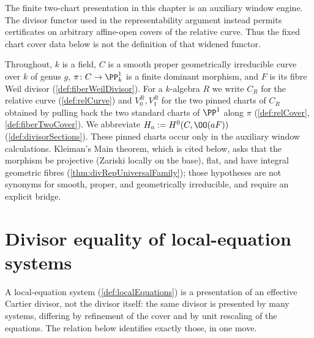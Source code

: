 The finite two-chart presentation in this chapter is an auxiliary window engine.  The divisor
functor used in the representability argument instead permits certificates on arbitrary
affine-open covers of the relative curve.  Thus the fixed chart cover data below is not the
definition of that widened functor.

Throughout, \(k\) is a field, \(C\) is a smooth proper geometrically irreducible curve over
\(k\) of genus \(g\), \(\pi \colon C \to \PP^1_k\) is a finite dominant morphism, and
\(F\) is its fibre Weil divisor (\ref{def:fiberWeilDivisor}). For a \(k\)-algebra \(R\) we
write \(C_R\) for the relative curve (\ref{def:relCurve}) and \(V_0^R, V_1^R\) for the two
pinned charts of \(C_R\) obtained by pulling back the two standard charts of \(\PP^1\)
along \(\pi\) (\ref{def:relCover}, \ref{def:fiberTwoCover}). We abbreviate
\(H_a := H^0(C, \OO(aF))\) (\ref{def:divisorSections}).  These pinned charts occur only
in the auxiliary window calculations.  Kleiman's Main theorem, which is cited below, asks
that the morphism be projective (Zariski locally on the base), flat, and have integral
geometric fibres (\ref{thm:divRepUniversalFamily}); those hypotheses are not synonyms for
smooth, proper, and geometrically irreducible, and require an explicit bridge.

\section{Divisor equality of local-equation systems}
\label{sec:diveq}

A local-equation system (\ref{def:localEquations}) is a presentation of an effective
Cartier divisor, not the divisor itself: the same divisor is presented by many systems,
differing by refinement of the cover and by unit rescaling of the equations. The relation
below identifies exactly those, in one move.

